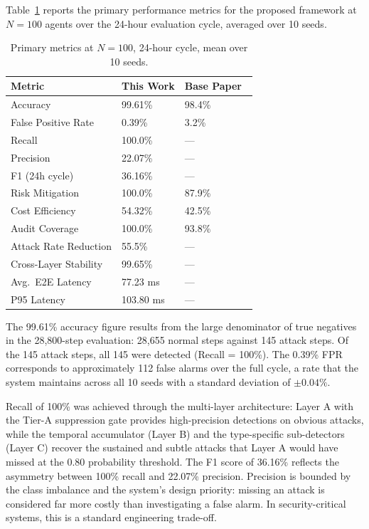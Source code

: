 Table~\ref{tab:primary} reports the primary performance metrics for the proposed framework at
$N = 100$ agents over the 24-hour evaluation cycle, averaged over 10 seeds.

\begin{table}[htbp]
\centering
\caption{Primary metrics at $N=100$, 24-hour cycle, mean over 10 seeds.}
\label{tab:primary}
\begin{tabular}{@{}lll@{}}
\hline
\textbf{Metric} & \textbf{This Work} & \textbf{Base Paper~\cite{priyadarsini2025}} \\
\hline
Accuracy                 & 99.61\%  & 98.4\%  \\
False Positive Rate      & 0.39\%   & 3.2\%   \\
Recall                   & 100.0\%  & ---     \\
Precision                & 22.07\%  & ---     \\
F1 (24h cycle)           & 36.16\%  & ---     \\
Risk Mitigation          & 100.0\%  & 87.9\%  \\
Cost Efficiency          & 54.32\%  & 42.5\%  \\
Audit Coverage           & 100.0\%  & 93.8\%  \\
Attack Rate Reduction    & 55.5\%   & ---     \\
Cross-Layer Stability    & 99.65\%  & ---     \\
Avg.\ E2E Latency        & 77.23 ms & ---     \\
P95 Latency              & 103.80 ms & ---    \\
\hline
\end{tabular}
\end{table}

The 99.61\% accuracy figure results from the large denominator of true negatives in the 28,800-step
evaluation: 28,655 normal steps against 145 attack steps. Of the 145 attack steps, all 145 were
detected (Recall = 100\%). The 0.39\% FPR corresponds to approximately 112 false alarms over the
full cycle, a rate that the system maintains across all 10 seeds with a standard deviation of
$\pm 0.04\%$.

Recall of 100\% was achieved through the multi-layer architecture: Layer A with the Tier-A
suppression gate provides high-precision detections on obvious attacks, while the temporal
accumulator (Layer B) and the type-specific sub-detectors (Layer C) recover the sustained and
subtle attacks that Layer A would have missed at the 0.80 probability threshold. The F1 score of
36.16\% reflects the asymmetry between 100\% recall and 22.07\% precision. Precision is bounded by
the class imbalance and the system's design priority: missing an attack is considered far more
costly than investigating a false alarm. In security-critical systems, this is a standard
engineering trade-off.

